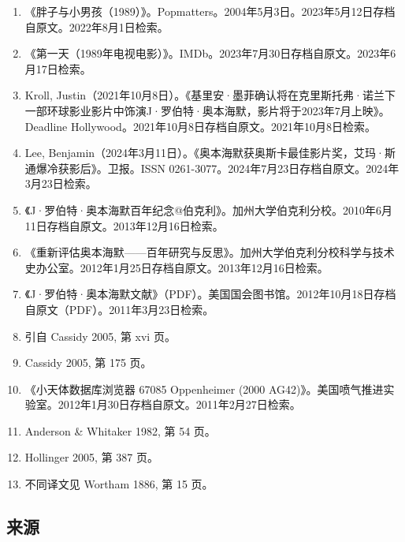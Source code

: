 \begin{enumerate}
\item 《胖子与小男孩（1989）》。Popmatters。2004年5月3日。2023年5月12日存档自原文。2022年8月1日检索。
\item 《第一天（1989年电视电影）》。IMDb。2023年7月30日存档自原文。2023年6月17日检索。
\item Kroll, Justin（2021年10月8日）。《基里安·墨菲确认将在克里斯托弗·诺兰下一部环球影业影片中饰演J·罗伯特·奥本海默，影片将于2023年7月上映》。Deadline Hollywood。2021年10月8日存档自原文。2021年10月8日检索。
\item Lee, Benjamin（2024年3月11日）。《奥本海默获奥斯卡最佳影片奖，艾玛·斯通爆冷获影后》。卫报。ISSN 0261-3077。2024年7月23日存档自原文。2024年3月23日检索。
\item 《J·罗伯特·奥本海默百年纪念@伯克利》。加州大学伯克利分校。2010年6月11日存档自原文。2013年12月16日检索。
\item 《重新评估奥本海默——百年研究与反思》。加州大学伯克利分校科学与技术史办公室。2012年1月25日存档自原文。2013年12月16日检索。
\item 《J·罗伯特·奥本海默文献》（PDF）。美国国会图书馆。2012年10月18日存档自原文（PDF）。2011年3月23日检索。
\item 引自 Cassidy 2005, 第 xvi 页。
\item Cassidy 2005, 第 175 页。
\item 《小天体数据库浏览器 67085 Oppenheimer (2000 AG42)》。美国喷气推进实验室。2012年1月30日存档自原文。2011年2月27日检索。
\item Anderson & Whitaker 1982, 第 54 页。
\item Hollinger 2005, 第 387 页。
\item 不同译文见 Wortham 1886, 第 15 页。
\end{enumerate}
\subsection{来源}

